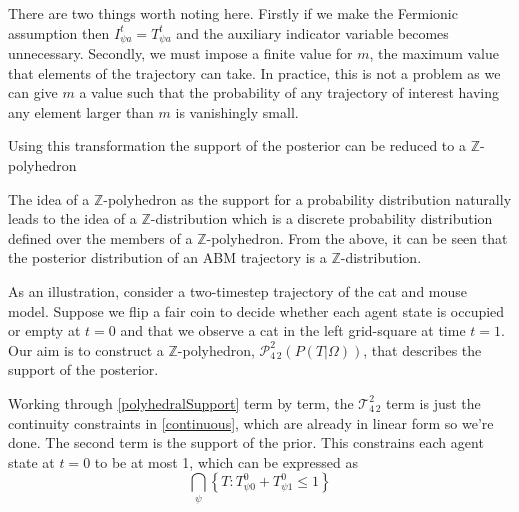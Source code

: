 \documentclass{article}
\begin{document}
There are two things worth noting here. Firstly if we make the Fermionic assumption then $I^t_{\psi a} = T^t_{\psi a}$ and the auxiliary indicator variable becomes unnecessary. Secondly, we must impose a finite value for $m$, the maximum value that elements of the trajectory can take. In practice, this is not a problem as we can give $m$ a value such that the probability of any trajectory of interest having any element larger than $m$ is vanishingly small.

Using this transformation the support of the posterior can be reduced to a $\mathbb{Z}$-polyhedron

The idea of a $\mathbb{Z}$-polyhedron as the support for a probability distribution naturally leads to the idea of a $\mathbb{Z}$-distribution which is a discrete probability distribution defined over the members of a $\mathbb{Z}$-polyhedron. From the above, it can be seen that the posterior distribution of an ABM trajectory is a $\mathbb{Z}$-distribution.

As an illustration, consider a two-timestep trajectory of the cat and mouse model. Suppose we flip a fair coin to decide whether each agent state is occupied or empty at $t=0$ and that we observe a cat in the left grid-square at time $t=1$. Our aim is to construct a $\mathbb{Z}$-polyhedron, $\mathcal{P}^2_{4\,2}(P(T|\Omega))$, that describes the support of the posterior.

Working through \eqref{polyhedralSupport} term by term, the $\mathcal{T}^2_{4\,2}$ term is just the continuity constraints in \eqref{continuous}, which are already in linear form so we're done. The second term is the support of the prior. This constrains each agent state at $t=0$ to be at most 1, which can be expressed as
\[
\bigcap_\psi \left\{T:T^0_{\psi 0} + T^0_{\psi 1} \le 1\right\}
\]
\end{document}
